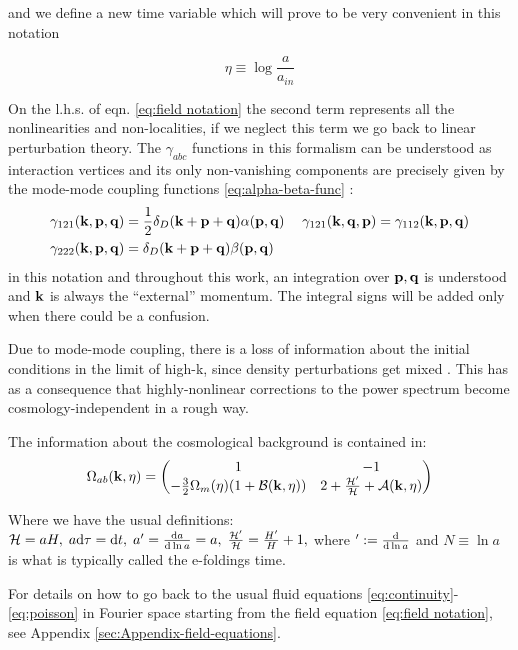 and we define a new time variable which will prove to be very convenient
in this notation

\[
\eta\equiv\log\frac{a}{a_{in}}
\]


On the l.h.s. of eqn. \ref{eq:field notation} the second term represents
all the nonlinearities and non-localities, if we neglect this term
we go back to linear perturbation theory. The $\gamma_{abc}$ functions
in this formalism can be understood as interaction vertices and its
only non-vanishing components are precisely given by the mode-mode
coupling functions \ref{eq:alpha-beta-func} : 
\begin{align}
\gamma_{121}(\mathbf{k},\mathbf{p},\mathbf{q}) & =\frac{1}{2}\delta_{D}(\mathbf{k}+\mathbf{p}+\mathbf{q})\alpha(\mathbf{p},\mathbf{q}) & \;\gamma_{121}(\mathbf{k},\mathbf{q},\mathbf{p})=\gamma_{112}(\mathbf{k},\mathbf{p},\mathbf{q})\label{eq:coupling-vertices}\\
\gamma_{222}(\mathbf{k},\mathbf{p},\mathbf{q}) & =\delta_{D}(\mathbf{k}+\mathbf{p}+\mathbf{q})\beta(\mathbf{p},\mathbf{q})\nonumber 
\end{align}
in this notation and throughout this work, an integration over $\mathbf{p},\mathbf{q}$
is understood and $\mathbf{k}$ is always the ``external'' momentum.
The integral signs will be added only when there could be a confusion.

Due to mode-mode coupling, there is a loss of information about the
initial conditions in the limit of high-k, since density perturbations
get mixed \cite{crocce_memory_2006}. This has as a consequence that
highly-nonlinear corrections to the power spectrum become cosmology-independent
in a rough way.

The information about the cosmological background is contained in:
\begin{equation}
\Omega_{ab}(\mathbf{k},\eta)=\begin{pmatrix}1 & -1\\
-\frac{3}{2}\Omega_{m}(\eta)(1+\mathcal{B}(\mathbf{k},\eta)) & 2+\frac{\mathcal{H}'}{\mathcal{H}}+\mathcal{A}(\mathbf{k},\eta)
\end{pmatrix}\label{eq:general-Omega-Matrix}
\end{equation}


Where we have the usual definitions: $\mathcal{H}=aH,\; a\mbox{d}\tau=\mbox{d}t,\; a'=\frac{\mathrm{d}a}{\mathrm{d}\ln a}=a,\;\frac{\mathcal{H}'}{\mathcal{H}}=\frac{H'}{H}+1,$
where $':=\frac{\mathrm{d}}{\mathrm{d}\ln a}$ and $N\equiv\ln a$ is what is typically
called the e-foldings time.

For details on how to go back to the usual fluid equations \ref{eq:continuity}-\ref{eq:poisson}
in Fourier space starting from the field equation \ref{eq:field notation},
see Appendix \ref{sec:Appendix-field-equations}.

